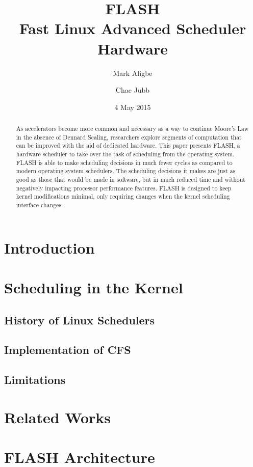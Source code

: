 \documentclass{sig-alternate-10pt}
\title{FLASH\\Fast Linux Advanced Scheduler Hardware}
\author{
	Mark Aligbe \\
	    \email{ma2799@columbia.edu}
	\and
    Chae Jubb \\
        \email{ecj2122@columbia.edu}
}
\date{4 May 2015}
\begin{document}
\maketitle

\begin{abstract}
As accelerators become more common and necessary as a way to continue Moore's Law in the absence of Dennard Scaling, researchers explore segments of computation that can be improved with the aid of dedicated hardware. This paper presents FLASH, a hardware scheduler to take over the task of scheduling from the operating system. FLASH is able to make scheduling decisions in much fewer cycles as compared to modern operating system schedulers. The scheduling decisions it makes are just as good as those that would be made in software, but in much reduced time and without negatively impacting processor performance features. FLASH is designed to keep kernel modifications minimal, only requiring changes when the kernel scheduling interface changes.

\end{abstract}


\section{Introduction}
\label{sec:intro}
\lipsum[1-3]


\section{Scheduling in the Kernel}
\label{sec:sched_in_kernel}
\subsection{History of Linux Schedulers}
\subsection{Implementation of CFS}
\subsection{Limitations}


\section{Related Works}
\lipsum[1-2]


\section{FLASH Architecture}
\label{sec:arch}
\lipsum[1-8]
\end{document}
